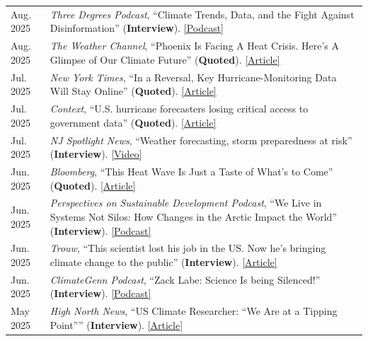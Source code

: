 \documentclass[margin,line,palatino,courier,10pt]{res}
\begin{document}
\begin{resume}
\begin{tabular}{@{}p{0.9in}p{4in}}
Aug. 2025 & \textit{Three Degrees Podcast}, ``Climate Trends, Data, and the Fight Against Disinformation'' (\textbf{Interview}). \href{https://threedegreespodcast.substack.com/p/three-degrees-climate-trends-data}{[Podcast]}\\
Aug. 2025 & \textit{The Weather Channel}, ``Phoenix Is Facing A Heat Crisis. Here’s A Glimpse of Our Climate Future'' (\textbf{Quoted}). \href{https://weather.com/news/climate/news/2025-08-05-phoenix-heat-crisis-climate-change}{[Article]}\\
Jul. 2025 & \textit{New York Times}, ``In a Reversal, Key Hurricane-Monitoring Data Will Stay Online'' (\textbf{Quoted}). \href{https://www.nytimes.com/2025/07/30/climate/hurricane-monitoring-data-defense-department.html}{[Article]}\\
Jul. 2025 & \textit{Context}, ``U.S. hurricane forecasters losing critical access to government data'' (\textbf{Quoted}). \href{https://www.context.news/climate-risks/us-hurricane-forecasters-losing-critical-access-to-government-data}{[Article]}\\
Jul. 2025 & \textit{NJ Spotlight News}, ``Weather forecasting, storm preparedness at risk'' (\textbf{Interview}). \href{https://www.youtube.com/watch?v=7tfH5IkM3Gc}{[Video]}\\
Jun. 2025 & \textit{Bloomberg}, ``This Heat Wave Is Just a Taste of What’s to Come'' (\textbf{Quoted}). \href{https://www.bloomberg.com/opinion/articles/2025-06-24/how-hot-will-it-get-heat-dome-has-a-rebuttal-for-climate-change-deniers}{[Article]}\\
Jun. 2025 & \textit{Perspectives on Sustainable Development Podcast}, ``We Live in Systems Not Silos: How Changes in the Arctic Impact the World'' (\textbf{Interview}). \href{https://www.buzzsprout.com/2318084/episodes/17389014}{[Podcast]}\\
Jun. 2025 & \textit{Trouw}, ``This scientist lost his job in the US. Now he’s bringing climate change to the public'' (\textbf{Interview}). \href{https://www.trouw.nl/wetenschap/deze-wetenschapper-verloor-zijn-baan-in-de-vs-nu-brengt-hij-het-klimaat-in-beeld-voor-het-grote-publiek~bd6c6b9c/}{[Article]}\\
Jun. 2025 & \textit{ClimateGenn Podcast}, ``Zack Labe: Science Is being Silenced!'' (\textbf{Interview}). \href{https://www.youtube.com/watch?v=dMSPXYDwv9k}{[Podcast]}\\
May 2025 & \textit{High North News}, ``US Climate Researcher: ``We Are at a Tipping Point'''' (\textbf{Interview}). \href{US Climate Researcher: “We Are at a Tipping Point”}{[Article]}\\

\end{tabular}
\end{resume}
\end{document}
